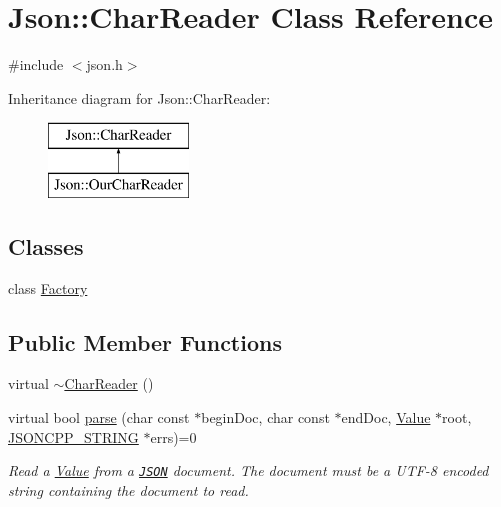 \hypertarget{classJson_1_1CharReader}{}\section{Json\+:\+:Char\+Reader Class Reference}
\label{classJson_1_1CharReader}


{\ttfamily \#include $<$json.\+h$>$}

Inheritance diagram for Json\+:\+:Char\+Reader\+:\begin{figure}[H]
\begin{center}
\leavevmode
\includegraphics[height=2.000000cm]{classJson_1_1CharReader}
\end{center}
\end{figure}
\subsection*{Classes}
\begin{DoxyCompactItemize}
\item 
class \hyperlink{classJson_1_1CharReader_1_1Factory}{Factory}
\end{DoxyCompactItemize}
\subsection*{Public Member Functions}
\begin{DoxyCompactItemize}
\item 
virtual \hyperlink{classJson_1_1CharReader_acaa7b6ad04fe1cf2ddfca06e66550d7e_acaa7b6ad04fe1cf2ddfca06e66550d7e}{$\sim$\+Char\+Reader} ()
\item 
virtual bool \hyperlink{classJson_1_1CharReader_a7983680d50fd0745f371c43b162e78e1_a7983680d50fd0745f371c43b162e78e1}{parse} (char const $\ast$begin\+Doc, char const $\ast$end\+Doc, \hyperlink{classJson_1_1Value}{Value} $\ast$root, \hyperlink{json_8h_a1e723f95759de062585bc4a8fd3fa4be_a1e723f95759de062585bc4a8fd3fa4be}{J\+S\+O\+N\+C\+P\+P\+\_\+\+S\+T\+R\+I\+NG} $\ast$errs)=0
\begin{DoxyCompactList}\small\item\em Read a \hyperlink{classJson_1_1Value}{Value} from a \href{http://www.json.org}{\tt J\+S\+ON} document. The document must be a U\+T\+F-\/8 encoded string containing the document to read. \end{DoxyCompactList}\end{DoxyCompactItemize}


